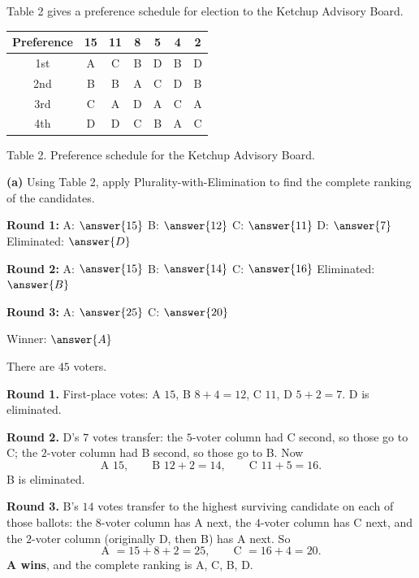 \documentclass[12pt]{ximera}
\begin{document}
\begin{problem}
Table 2 gives a preference schedule for election to the Ketchup Advisory Board.

\begin{center}
\begin{tabular}{c|cccccc}
Preference & 15 & 11 & 8 & 5 & 4 & 2 \\\hline
1st & A & C & B & D & B & D \\
2nd & B & B & A & C & D & B \\
3rd & C & A & D & A & C & A \\
4th & D & D & C & B & A & C
\end{tabular}

\smallskip
Table 2. Preference schedule for the Ketchup Advisory Board.
\end{center}

\begin{prompt}
\textbf{(a)} Using Table 2, apply Plurality-with-Elimination to find the complete
ranking of the candidates.

\textbf{Round 1:} A: $\answer{15}$ \quad B: $\answer{12}$ \quad C: $\answer{11}$ \quad
D: $\answer{7}$ \qquad Eliminated: $\answer{D}$

\smallskip
\textbf{Round 2:} A: $\answer{15}$ \quad B: $\answer{14}$ \quad C: $\answer{16}$
\qquad Eliminated: $\answer{B}$

\smallskip
\textbf{Round 3:} A: $\answer{25}$ \quad C: $\answer{20}$

\smallskip
Winner: $\answer{A}$

\begin{feedback}
There are $45$ voters.

\textbf{Round 1.} First-place votes: A $15$, B $8+4 = 12$, C $11$, D $5+2 = 7$.
D is eliminated.

\textbf{Round 2.} D's $7$ votes transfer: the $5$-voter column had C second, so those
go to C; the $2$-voter column had B second, so those go to B. Now
\[ \text{A } 15, \qquad \text{B } 12+2 = 14, \qquad \text{C } 11+5 = 16. \]
B is eliminated.

\textbf{Round 3.} B's $14$ votes transfer to the highest surviving candidate on each
of those ballots: the $8$-voter column has A next, the $4$-voter column has C next,
and the $2$-voter column (originally D, then B) has A next. So
\[ \text{A } = 15+8+2 = 25, \qquad \text{C } = 16+4 = 20. \]
\textbf{A wins}, and the complete ranking is A, C, B, D.
\end{feedback}
\end{prompt}


\end{problem}
\end{document}
